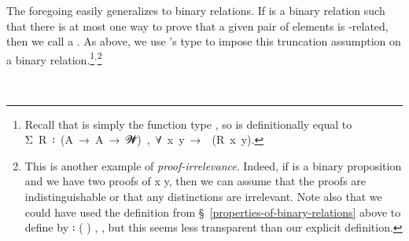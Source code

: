 The foregoing easily generalizes to binary relations.  If  is a binary relation such that there is at most one way to prove that a given pair of elements is -related, then we call  a . As above, we use \typetopology's  type to impose this truncation assumption on a binary relation.\footnote{Recall that  is simply the function type , so  is definitionally equal to \af Σ~\ab R~\af ꞉~(\ab A~\as →~\ab A~\as →~\ab 𝓦\af ̇)~\af ,~\as ∀~\ab x~\ab y~\as →~~(\ab R~\ab x~\ab y).}$^, $\footnote{%
This is another example of \emph{proof-irrelevance}. Indeed, if  is a binary proposition and we
have two proofs of  \ab x \ab y, then we can assume that the proofs are indistinguishable or that any distinctions are irrelevant. Note also that we could have used the definition  from \S~\ref{properties-of-binary-relations} above to define  by   \af ꞉ (  ) ,  , but this seems less transparent than our explicit definition.}
\ccpad
\begin{code}%
\>[0]\AgdaSpace{}%
\AgdaSymbol{:}\AgdaSpace{}%
\AgdaSpace{}%
\AgdaSpace{}%
\AgdaSpace{}%
\AgdaSymbol{(}\AgdaSpace{}%
\AgdaSymbol{:}\AgdaSpace{}%
\AgdaSymbol{)}\AgdaSpace{}%
\AgdaSpace{}%
\AgdaSpace{}%
\AgdaSpace{}%
\AgdaSpace{}%
\AgdaSpace{}%
\<%
\\
\>[0]\AgdaSpace{}%
\AgdaSpace{}%
\AgdaSpace{}%
\AgdaSymbol{=}\AgdaSpace{}%
\AgdaSpace{}%
\AgdaSpace{}%
\AgdaSpace{}%
\AgdaSymbol{(}\AgdaSpace{}%
\AgdaSpace{}%
\AgdaSymbol{)}\AgdaSpace{}%
\AgdaFunction{,}\AgdaSpace{}%
\AgdaSpace{}%
\AgdaSpace{}%
\AgdaSpace{}%
\AgdaSpace{}%
\AgdaSpace{}%
\AgdaSymbol{(}\AgdaSpace{}%
\AgdaSpace{}%
\AgdaSymbol{)}\<%
\end{code}

